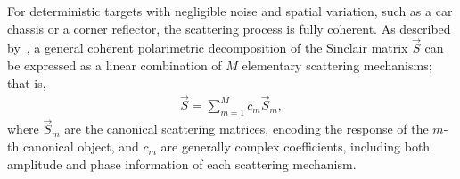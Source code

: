 For deterministic targets with negligible noise and spatial variation, such as a car chassis or a corner reflector, the scattering process is fully coherent.
As described by~\textcite{gaglioneKrogagerDecompositionPseudoZernike2014}, a general coherent polarimetric decomposition of the Sinclair matrix $\vec S$ can be expressed as a linear combination of $M$ elementary scattering mechanisms; that is,
\begin{align}
    \vec S = \sum_{m=1}^M c_m \vec S_m,
\end{align}
where $\vec S_m$ are the canonical scattering matrices, encoding the response of the $m$-th canonical object, and $c_m$ are generally complex coefficients, including both amplitude and phase information of each scattering mechanism.

